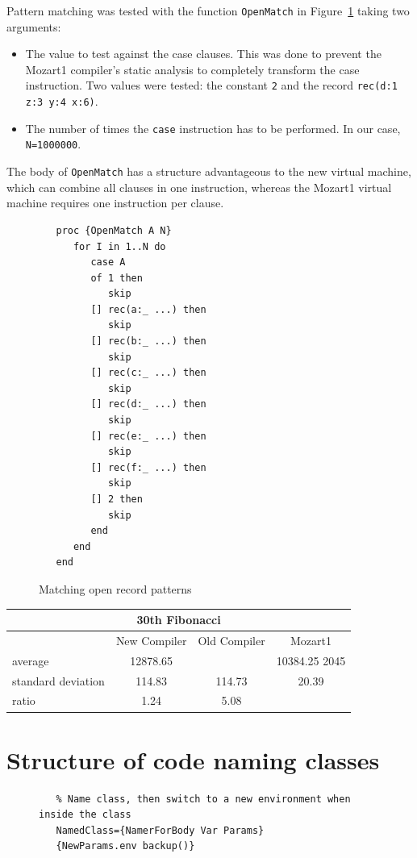 \documentclass[a4paper]{memoir}
\begin{document}
\begin{appendices}
Pattern matching was tested with the function \lstinline!OpenMatch! in Figure~\ref{fig:perfs:openmatch} taking two
arguments:
\begin{itemize}
  \item The value to test against the case clauses. This was done to prevent the
    Mozart1 compiler's static analysis to completely transform the case
    instruction. Two values were tested: the constant \lstinline!2! and the
    record \lstinline!rec(d:1 z:3 y:4 x:6)!. 
  \item The number of times the \lstinline!case! instruction has to be
    performed. In our case, \lstinline!N=1000000!.
\end{itemize} 
The body of \lstinline!OpenMatch! has a structure advantageous to the new
virtual machine, which can combine all clauses in one instruction, whereas the
Mozart1 virtual machine requires one instruction per clause.

\begin{figure}[h]
\begin{lstlisting}
   proc {OpenMatch A N}
      for I in 1..N do
         case A
         of 1 then
            skip
         [] rec(a:_ ...) then
            skip
         [] rec(b:_ ...) then
            skip
         [] rec(c:_ ...) then
            skip
         [] rec(d:_ ...) then
            skip
         [] rec(e:_ ...) then
            skip
         [] rec(f:_ ...) then
            skip
         [] 2 then
            skip
         end
      end
   end
\end{lstlisting}
\caption{Matching open record patterns}
\label{fig:perfs:openmatch}
\end{figure}


\begin{center}
\begin{tabular} {| l c c c|}
\hline
\multicolumn{4}{|c|}{\textbf{30th Fibonacci}} \\ \hline
  & New Compiler& Old Compiler & Mozart1 \\
average&12878.65&&10384.25  2045 \\
standard deviation&114.83& 114.73& 20.39 \\
ratio&1.24& 5.08  & \\

\hline
\end{tabular}
\end{center}



\chapter{Structure of code naming classes}\label{appendix:classnamer}
\begin{figure}[H]
\begin{lstlisting}
   % Name class, then switch to a new environment when inside the class
   NamedClass={NamerForBody Var Params}
   {NewParams.env backup()}


\end{lstlisting}
\end{figure}
\end{appendices}
\end{document}
